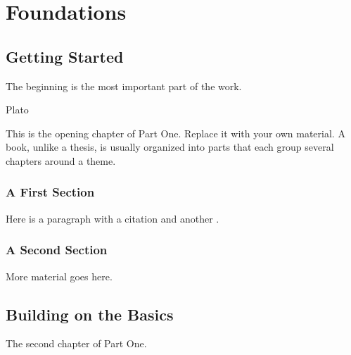 \part{Foundations}

\chapter{Getting Started}
\label{chapter:getting-started}

\epigraph{The beginning is the most important part of the work.}{Plato}

This is the opening chapter of Part One. Replace it with your own material.
A book, unlike a thesis, is usually organized into parts that each group
several chapters around a theme.

\section{A First Section}
Here is a paragraph with a citation \cite{example-book} and another
\cite{example-article}.

\section{A Second Section}
More material goes here.

\chapter{Building on the Basics}
\label{chapter:building-on-basics}

The second chapter of Part One.
